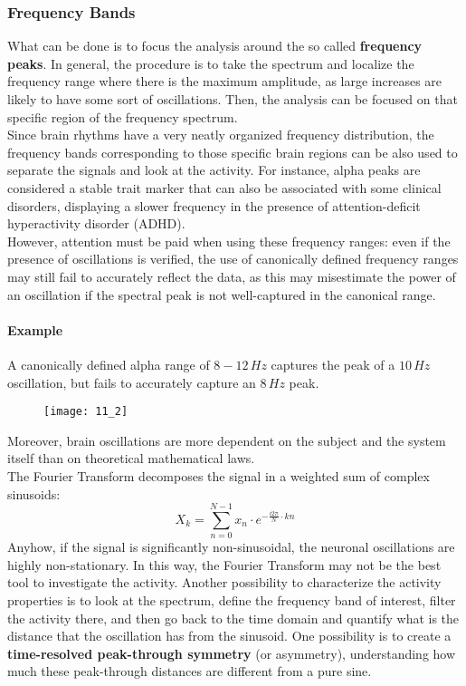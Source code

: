 \subsubsection{Frequency Bands}
What can be done is to focus the analysis around the so called \textbf{frequency peaks}.
In general, the procedure is to take the spectrum and localize the frequency range where
there is the maximum amplitude, as large increases are likely to have some sort of oscillations.
Then, the analysis can be focused on that specific region of the frequency spectrum.\\
Since brain rhythms have a very neatly organized frequency distribution, the frequency
bands corresponding to those specific brain regions can be also used to separate the signals
and look at the activity. For instance, alpha peaks are considered a stable trait marker
that can also be associated with some clinical disorders, displaying a slower frequency in
the presence of attention-deficit hyperactivity disorder (ADHD).\\
However, attention must be paid when using these frequency ranges: even if the presence of
oscillations is verified, the use of canonically defined frequency ranges may still fail
to accurately reflect the data, as this may misestimate the power of an oscillation if the
spectral peak is not well-captured in the canonical range.
\paragraph{Example} A canonically defined alpha range of \(8-12\,Hz\) captures the peak of
a \(10\,Hz\) oscillation, but fails to accurately capture an \(8\,Hz\) peak.
\begin{figure}[H]
    \texttt{[image: 11\_2]}
    \centering
\end{figure}
Moreover, brain oscillations are more dependent on the subject and the system itself than
on theoretical mathematical laws.\\
The Fourier Transform decomposes the signal in a weighted sum of complex sinusoids:
\begin{equation*}
    X_k=\sum_{n=0}^{N-1} x_n\cdot e^{-\frac{i2\pi}{N}\cdot kn}
\end{equation*}
Anyhow, if the signal is significantly non-sinusoidal, the neuronal oscillations are highly
non-stationary. In this way, the Fourier Transform may not be the best tool to investigate
the activity. Another possibility to characterize the activity properties is to look at the
spectrum, define the frequency band of interest, filter the activity there, and then go
back to the time domain and quantify what is the distance that the oscillation has from the
sinusoid. One possibility is to create a \textbf{time-resolved peak-through symmetry}
(or asymmetry), understanding how much these peak-through distances are different from a pure sine.
